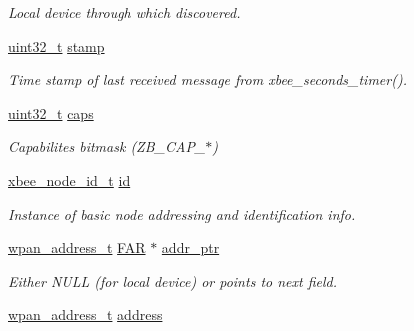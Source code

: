 \begin{DoxyCompactItemize}
\begin{DoxyCompactList}\small\item\em Local device through which discovered. \end{DoxyCompactList}\item 
\hyperlink{group__hal__dos_ga09a1e304d66d35dd47daffee9731edaa}{uint32\-\_\-t} \hyperlink{structsxa__node__t_ac543485164457c0eefd43dcee04c82c6}{stamp}
\begin{DoxyCompactList}\small\item\em Time stamp of last received message from xbee\-\_\-seconds\-\_\-timer(). \end{DoxyCompactList}\item 
\hypertarget{structsxa__node__t_a6d8abccf90f28f0ea0a3423eaffacc7e}{\hyperlink{group__hal__dos_ga09a1e304d66d35dd47daffee9731edaa}{uint32\-\_\-t} \hyperlink{structsxa__node__t_a6d8abccf90f28f0ea0a3423eaffacc7e}{caps}}\label{structsxa__node__t_a6d8abccf90f28f0ea0a3423eaffacc7e}

\begin{DoxyCompactList}\small\item\em Capabilites bitmask (Z\-B\-\_\-\-C\-A\-P\-\_\-$\ast$) \end{DoxyCompactList}\item 
\hypertarget{structsxa__node__t_a65028dacab709b3d58f37d40d9c1b572}{\hyperlink{structxbee__node__id__t}{xbee\-\_\-node\-\_\-id\-\_\-t} \hyperlink{structsxa__node__t_a65028dacab709b3d58f37d40d9c1b572}{id}}\label{structsxa__node__t_a65028dacab709b3d58f37d40d9c1b572}

\begin{DoxyCompactList}\small\item\em Instance of basic node addressing and identification info. \end{DoxyCompactList}\item 
\hyperlink{structwpan__address__t}{wpan\-\_\-address\-\_\-t} \hyperlink{group__hal_gaef060b3456fdcc093a7210a762d5f2ed}{F\-A\-R} $\ast$ \hyperlink{structsxa__node__t_ae22454fb2324ac2f3c9ddc07fe24ae35}{addr\-\_\-ptr}
\begin{DoxyCompactList}\small\item\em Either N\-U\-L\-L (for local device) or points to next field. \end{DoxyCompactList}\item 
\hypertarget{structsxa__node__t_a66a58a737aee9733019399e2eceabf4a}{\hyperlink{structwpan__address__t}{wpan\-\_\-address\-\_\-t} \hyperlink{structsxa__node__t_a66a58a737aee9733019399e2eceabf4a}{address}}\label{structsxa__node__t_a66a58a737aee9733019399e2eceabf4a}


\end{DoxyCompactItemize}
